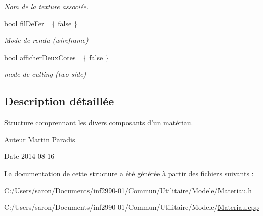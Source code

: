 \begin{DoxyCompactItemize}
\begin{DoxyCompactList}\small\item\em Nom de la texture associée. \end{DoxyCompactList}\item 
\hypertarget{structmodele_1_1_materiau_a55e6d3d19eb038d86097568353cbad06}{bool \hyperlink{structmodele_1_1_materiau_a55e6d3d19eb038d86097568353cbad06}{fil\-De\-Fer\-\_\-} \{ false \}}\label{structmodele_1_1_materiau_a55e6d3d19eb038d86097568353cbad06}

\begin{DoxyCompactList}\small\item\em Mode de rendu (wireframe) \end{DoxyCompactList}\item 
\hypertarget{structmodele_1_1_materiau_aab5dc5905e9d580acdeba0bcc7853108}{bool \hyperlink{structmodele_1_1_materiau_aab5dc5905e9d580acdeba0bcc7853108}{afficher\-Deux\-Cotes\-\_\-} \{ false \}}\label{structmodele_1_1_materiau_aab5dc5905e9d580acdeba0bcc7853108}

\begin{DoxyCompactList}\small\item\em mode de culling (two-\/side) \end{DoxyCompactList}\end{DoxyCompactItemize}


\subsection{Description détaillée}
Structure comprennant les divers composants d'un matériau. 

\begin{DoxyAuthor}{Auteur}
Martin Paradis 
\end{DoxyAuthor}
\begin{DoxyDate}{Date}
2014-\/08-\/16 
\end{DoxyDate}


La documentation de cette structure a été générée à partir des fichiers suivants \-:\begin{DoxyCompactItemize}
\item 
C\-:/\-Users/saron/\-Documents/inf2990-\/01/\-Commun/\-Utilitaire/\-Modele/\hyperlink{_materiau_8h}{Materiau.\-h}\item 
C\-:/\-Users/saron/\-Documents/inf2990-\/01/\-Commun/\-Utilitaire/\-Modele/\hyperlink{_materiau_8cpp}{Materiau.\-cpp}\end{DoxyCompactItemize}
